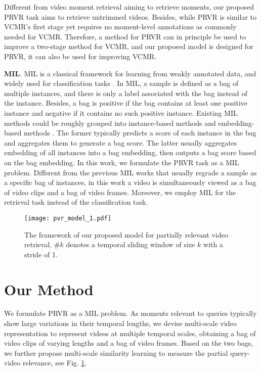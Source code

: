 \documentclass[sigconf]{acmart}
\begin{document}
Different from video moment retrieval aiming to retrieve moments, our proposed PRVR task aims to retrieve untrimmed videos.
 Besides, while PRVR is similar to VCMR's first stage yet requires no moment-level annotations as commonly needed for VCMR. Therefore, a method for PRVR can in principle be used to improve a two-stage method for VCMR, and our proposed model is designed for PRVR, it can also be used for improving VCMR. 


\textbf{MIL}. 
MIL \cite{dietterich1997solving,maron1997framework} is a classical framework for learning from weakly annotated data, and widely used for classification tasks \cite{li2021multi,li2021dual}. In MIL, a sample is defined as a bag of multiple instances, and there is only a label associated with the bag instead of the instance. 
Besides, a bag is positive if the bag contains at least one positive instance and negative if it contains no such positive instance. 
Existing MIL methods could be roughly grouped into instance-based methods \cite{pinheiro2015image,oquab2015object,feng2017deep} and embedding-based methods \cite{ilse2018attention,tu2019multiple,li2021dual}.
The former typically predicts a score of each instance in the bag and aggregates them to generate a bag score. The latter usually aggregates embedding of all instances into a bag embedding, then outputs a bag score based on the bag embedding.
In this work, we formulate the PRVR task as a MIL problem.
Different from the previous MIL works that usually regrade a sample as a specific bag of instances, in this work a video is simultaneously viewed as a bag of video clips and a bag of video frames. Moreover, we employ MIL for the retrieval task instead of the classification task.



\begin{figure}[tb!]
\centering\texttt{[image: pvr\_model\_1.pdf]}
\vspace{-8mm}
\caption{The framework of our proposed model for partially relevant video retrieval.
\#$k$ denotes a temporal sliding window of size $k$ with a stride of 1.
}\label{fig:framework}
\vspace{-4mm}
\end{figure}

\section{Our Method}
We formulate PRVR as a MIL problem. 
As moments relevant to queries typically show large variations in their temporal lengths, we devise multi-scale video representation to represent videos at multiple temporal scales, obtaining a bag of video clips of varying lengths and a bag of video frames. Based on the two bags, we further propose multi-scale similarity learning to measure the partial query-video relevance, see Fig. \ref{fig:framework}.
\end{document}
